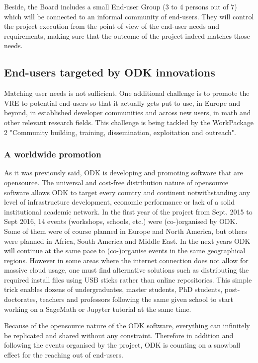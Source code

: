 \documentclass{deliverablereport}
\begin{document}
Beside, the Board includes a small End-user Group (3 to 4 persons out
of 7) which will be connected to an informal community of
end-users. They will control the project execution from the point of
view of the end-user needs and requirements, making sure that the
outcome of the project indeed matches those needs.

\subsection{End-users targeted by ODK innovations}

Matching user needs is not sufficient. One additional challenge is to
promote the VRE to potential end-users so that it actually gets put to
use, in Europe and beyond, in established developer communities and
across new users, in math and other relevant research fields. This
challenge is being tackled by the WorkPackage 2 "Community building,
training, dissemination, exploitation and outreach".


\subsubsection{A worldwide promotion}

As it was previously said, ODK is developing and promoting software that are opensource. The universal and cost-free distribution nature of opensource software allows ODK to target every country and continent notwithstanding any level of infrastructure development, economic performance or lack of a solid institutional academic network.
In the first year of the project from Sept. 2015 to Sept 2016, 14 events (workshops, schools, etc.) were (co-)organised by ODK. Some of them were of course planned in Europe and North America, but others were planned in Africa, South America and Middle East. In the next years ODK will continue at the same pace to (co-)organise events in the same geographical regions.
However in some areas where the internet connection does not allow for massive cloud usage, one must find alternative solutions such as distributing the required install files using USB sticks  rather than online repositories. This simple trick enables dozens of undergraduates, master students, PhD students, post-doctorates, teachers and professors following the same given school to start working on a SageMath or Jupyter tutorial at the same time.

Because of the opensource nature of the ODK software, everything can infinitely be replicated and shared without any constraint. Therefore in addition and following the events organised by the project, ODK is counting on a snowball effect for the reaching out of end-users.
\end{document}
